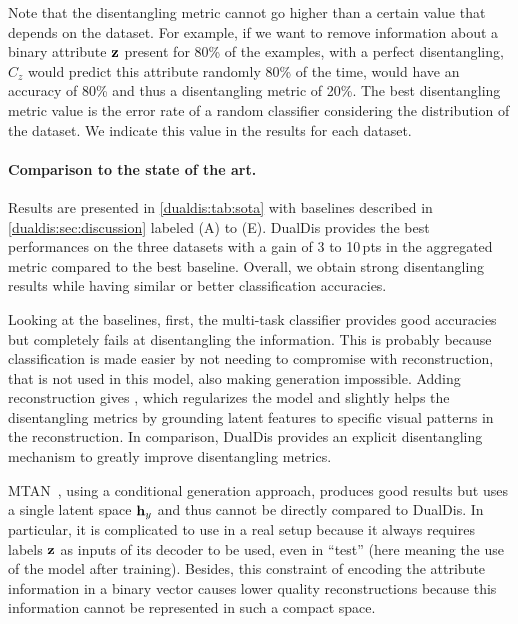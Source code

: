 Note that the disentangling metric cannot go higher than a certain value that depends on the dataset. For example, if we want to remove information about a binary attribute $\mathbf{z}$ present for 80\% of the examples, with a perfect disentangling, $C_z$ would predict this attribute randomly 80\% of the time, would have an accuracy of 80\% and thus a disentangling metric of 20\%. The best disentangling metric value is the error rate of a random classifier considering the distribution of the dataset. We indicate this value in the results for each dataset.



\paragraph{Comparison to the state of the art.}

Results are presented in \autoref{dualdis:tab:sota} with baselines described in \autoref{dualdis:sec:discussion} labeled (A) to (E).
%
DualDis provides the best performances on the three datasets with a gain of 3 to 10\,pts in the aggregated metric compared to the best baseline. Overall, we obtain strong disentangling results while having similar or better classification accuracies.

Looking at the baselines, first, the multi-task classifier \MTref \citep{kokkinos2017} provides good accuracies but completely fails at disentangling the information. This is probably because classification is made easier by not needing to compromise with reconstruction, that is not used in this model, also making generation impossible.
%
Adding reconstruction gives \HNrefs, which regularizes the model and slightly helps the disentangling metrics by grounding latent features to specific visual patterns in the reconstruction. In comparison, DualDis provides an explicit disentangling mechanism to greatly improve disentangling metrics.

MTAN~\MTANref \citep{Liu2018}, using a conditional generation approach, produces good results but uses a single latent space $\mathbf{h}_y$ and thus cannot be directly compared to DualDis. In particular, it is complicated to use in a real setup because it always requires labels $\mathbf{z}$ as inputs of its decoder to be used, even in ``test'' (here meaning the use of the model after training). Besides, this constraint of encoding the attribute information in a binary vector causes lower quality reconstructions because this information cannot be represented in such a compact space.

